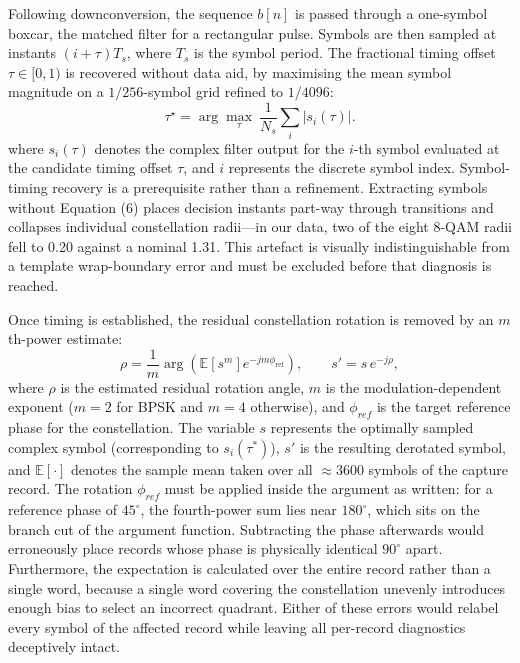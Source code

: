 \documentclass{ieeeaccess}
\begin{document}
Following downconversion, the sequence $b[n]$ is passed through a one-symbol boxcar, the matched filter for a rectangular pulse. Symbols are then sampled at instants $(i+\tau)T_s$, where $T_s$ is the symbol period. The fractional timing offset $\tau \in [0, 1)$ is recovered without data aid, by maximising the mean symbol magnitude on a $1/256$-symbol grid refined to $1/4096$:
\begin{equation}
\tau^{\star} = \arg\max_{\tau} \ \frac{1}{N_s}\sum_{i} \big| s_i(\tau) \big| .
\label{eq:timing}
\end{equation}
where $s_i(\tau)$ denotes the complex filter output for the $i$-th symbol evaluated at the candidate timing offset $\tau$, and $i$ represents the discrete symbol index. Symbol-timing recovery is a prerequisite rather than a refinement. Extracting symbols without Equation (6) places decision instants part-way through transitions and collapses individual constellation radii—in our data, two of the eight 8-QAM radii fell to 0.20 against a nominal 1.31. This artefact is visually indistinguishable from a template wrap-boundary error and must be excluded before that diagnosis is reached. 

Once timing is established, the residual constellation rotation is removed by an $m$th-power estimate:
\begin{equation}
\rho = \frac{1}{m}\arg\!\left(
  \mathbb{E}\!\left[s^m\right] e^{-j m \phi_{\mathrm{ref}}}\right),
\qquad s' = s\,e^{-j\rho},
\label{eq:derotate}
\end{equation}
where $\rho$ is the estimated residual rotation angle, $m$ is the modulation-dependent exponent ($m = 2$ for BPSK and $m = 4$ otherwise), and $\phi_{ref}$ is the target reference phase for the constellation. The variable $s$ represents the optimally sampled complex symbol (corresponding to $s_i(\tau^*)$), $s'$ is the resulting derotated symbol, and $\mathbb{E}[\cdot]$ denotes the sample mean taken over all $\approx 3600$ symbols of the capture record.   The rotation $\phi_{ref}$ must be applied inside the argument as written: for a reference phase of $45^\circ$, the fourth-power sum lies near $180^\circ$, which sits on the branch cut of the argument function. Subtracting the phase afterwards would erroneously place records whose phase is physically identical $90^\circ$ apart. Furthermore, the expectation is calculated over the entire record rather than a single word, because a single word covering the constellation unevenly introduces enough bias to select an incorrect quadrant. Either of these errors would relabel every symbol of the affected record while leaving all per-record diagnostics deceptively intact.
\end{document}
